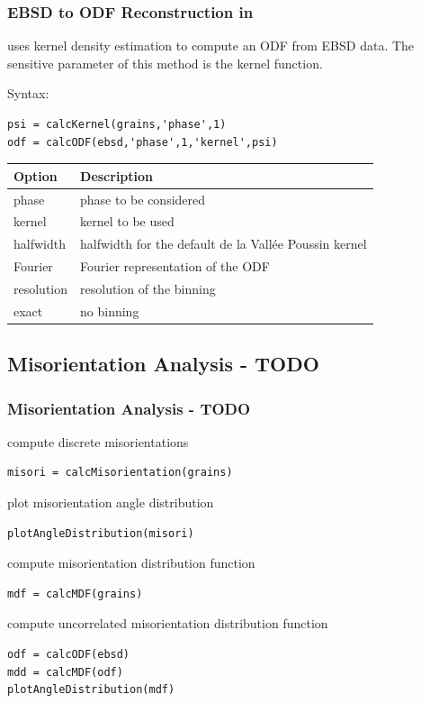 \begin{frame}[fragile]
  \frametitle{EBSD to ODF Reconstruction in \MTEX}

  \mtex uses kernel density estimation to compute an ODF from EBSD data. The
  sensitive parameter of this method is the kernel function.

\medskip

  Syntax:
  \begin{alertenv}
\begin{lstlisting}
psi = calcKernel(grains,'phase',1)
odf = calcODF(ebsd,'phase',1,'kernel',psi)
\end{lstlisting}
  \end{alertenv}

\medskip

\begin{tabular}{ll}
  Option & Description \\
  \toprule
  phase & phase to be considered\\
  kernel & kernel to be used\\
  halfwidth & halfwidth for the default de la Vall\'ee Poussin kernel\\
  Fourier & Fourier representation of the ODF\\
  resolution &  resolution of the binning\\
  exact & no binning
\end{tabular}


\end{frame}

\subsection*{Misorientation Analysis - TODO}

\begin{frame}
  \frametitle{Misorientation Analysis - TODO}

  compute discrete misorientations

\begin{lstlisting}
misori = calcMisorientation(grains)
\end{lstlisting}

  \medskip
  \pause

plot misorientation angle distribution
\begin{lstlisting}
plotAngleDistribution(misori)
\end{lstlisting}

  \medskip
  \pause

compute misorientation distribution function
\begin{lstlisting}
mdf = calcMDF(grains)
\end{lstlisting}

  \medskip
  \pause


compute uncorrelated misorientation distribution function
\begin{lstlisting}
odf = calcODF(ebsd)
mdd = calcMDF(odf)
plotAngleDistribution(mdf)
\end{lstlisting}

\end{frame}


